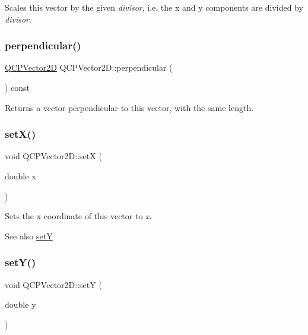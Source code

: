 Scales this vector by the given {\itshape divisor}, i.\+e. the x and y components are divided by {\itshape divisor}. \mbox{\label{class_q_c_p_vector2_d_a0e08d09f9027784237e302e32290b001}} 
\subsubsection{\texorpdfstring{perpendicular()}{perpendicular()}}
{\footnotesize\ttfamily \hyperlink{class_q_c_p_vector2_d}{Q\+C\+P\+Vector2D} Q\+C\+P\+Vector2\+D\+::perpendicular (\begin{DoxyParamCaption}{ }\end{DoxyParamCaption}) const\hspace{0.3cm}{\ttfamily [inline]}}

Returns a vector perpendicular to this vector, with the same length. \mbox{\label{class_q_c_p_vector2_d_ab4249e6ce7bfc37be56f014c54b761ae}} 
\subsubsection{\texorpdfstring{set\+X()}{setX()}}
{\footnotesize\ttfamily void Q\+C\+P\+Vector2\+D\+::setX (\begin{DoxyParamCaption}\item[{double}]{x }\end{DoxyParamCaption})\hspace{0.3cm}{\ttfamily [inline]}}

Sets the x coordinate of this vector to {\itshape x}.

\begin{DoxySeeAlso}{See also}
\hyperlink{class_q_c_p_vector2_d_ada288019aa8cd51e3b30acfc07b461dc}{setY} 
\end{DoxySeeAlso}
\mbox{\label{class_q_c_p_vector2_d_ada288019aa8cd51e3b30acfc07b461dc}} 
\subsubsection{\texorpdfstring{set\+Y()}{setY()}}
{\footnotesize\ttfamily void Q\+C\+P\+Vector2\+D\+::setY (\begin{DoxyParamCaption}\item[{double}]{y }\end{DoxyParamCaption})\hspace{0.3cm}{\ttfamily [inline]}}

